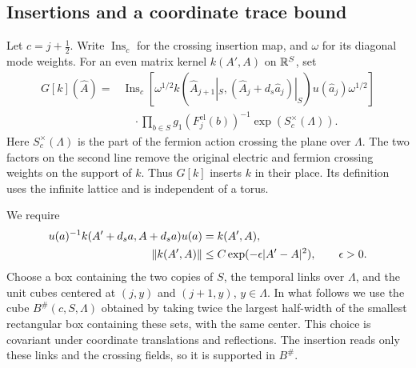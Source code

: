 \subsection{Insertions and a coordinate trace bound}\label{subsec:diag-insertions}

Let $c=j+\tfrac12$. Write $\operatorname{Ins}_c$ for the crossing
insertion map, and $\omega$ for its diagonal mode weights. For an
even matrix kernel $k(A',A)$ on $\mathbb R^S$, set
\begin{equation}\label{eq:diag-kernel-insertion}
 \begin{split}
 G[k](\widehat A)={}&\operatorname{Ins}_c\!\left[
   \omega^{1/2}k(\widehat A_{j+1}|_S,
           (\widehat A_j+d_s\widehat a_j)|_S)
             u(\widehat a_j)\omega^{1/2}\right]\\
 &\quad\cdot\prod_{b\in S}g_1(F_j^{\mathrm{el}}(b))^{-1}
                      \exp(S_c^\times(\Lambda)).
 \end{split}
\end{equation}
Here $S_c^\times(\Lambda)$ is the part of the fermion action crossing
the plane over $\Lambda$. The two factors on the second line remove
the original electric and fermion crossing weights on the support
of $k$. Thus $G[k]$ inserts $k$ in their place. Its definition uses
the infinite lattice and is independent of a torus.

We require
\begin{align}\label{eq:diag-kernel-conditions}
 u(a)^{-1}k(A'+d_sa,A+d_sa)u(a)&=k(A',A),\notag\\
 \|k(A',A)\|&\le C\exp(-\epsilon|A'-A|^2),\qquad\epsilon>0.
\end{align}
Choose a box containing the two copies of $S$, the temporal links
over $\Lambda$, and the unit cubes centered at $(j,y)$ and $(j+1,y)$,
$y\in\Lambda$. In what follows we use the cube $B^\#(c,S,\Lambda)$
obtained by taking twice the largest half-width of the smallest
rectangular box containing these sets, with the same center. This
choice is covariant under coordinate translations and reflections.
The insertion reads only these links and the crossing fields, so
it is supported in $B^\#$.

